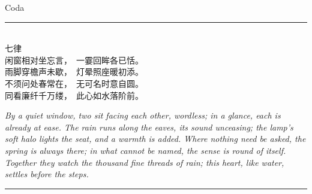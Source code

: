 \clearpage
\thispagestyle{empty}
\vspace*{2.2cm}
\begin{center}
{\small\color{gold} Coda}\\[0.3cm]
\textcolor{gold}{\rule{0.3\linewidth}{0.4pt}}\\[1.4cm]

%

{\cjk\large\color{rosedeep}
七律\\[0.7em]
\normalsize\color{rose}
闲窗相对坐忘言，　一霎回眸各已恬。\\[0.4em]
雨脚穿檐声未歇，　灯晕照座暖初添。\\[0.4em]
不须问处春常在，　无可名时意自圆。\\[0.4em]
同看廉纤千万缕，　此心如水落阶前。
}\\[1.6cm]

\begin{minipage}{0.78\linewidth}
\centering\itshape\footnotesize\color{inksoft}
By a quiet window, two sit facing each other, wordless; in a glance, each is already at ease. The rain runs along the eaves, its sound unceasing; the lamp's soft halo lights the seat, and a warmth is added. Where nothing need be asked, the spring is always there; in what cannot be named, the sense is round of itself. Together they watch the thousand fine threads of rain; this heart, like water, settles before the steps.
\end{minipage}

\vfill
\noindent\hfill\textcolor{gold}{\rule{0.2\linewidth}{0.4pt}}\hfill\null
\end{center}
\clearpage
